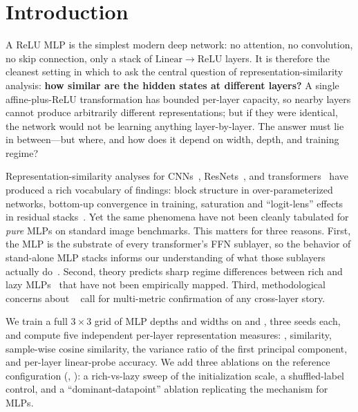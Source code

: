 \section{Introduction}
\label{sec:intro}

A ReLU MLP is the simplest modern deep network: no attention, no convolution, no skip connection, only a stack of $\mathrm{Linear}\!\to\!\mathrm{ReLU}$ layers. It is therefore the cleanest setting in which to ask the central question of representation-similarity analysis: \textbf{how similar are the hidden states at different layers?} A single affine-plus-ReLU transformation has bounded per-layer capacity, so nearby layers cannot produce arbitrarily different representations; but if they were identical, the network would not be learning anything layer-by-layer. The answer must lie in between---but where, and how does it depend on width, depth, and training regime?

Representation-similarity analyses for CNNs~\citep{kornblith2019similarity,nguyen2021wide}, ResNets~\citep{nguyen2022origins}, and transformers~\citep{raghu2021vit,brown2023dissimilarity} have produced a rich vocabulary of findings: block structure in over-parameterized networks, bottom-up convergence in training, saturation and ``logit-lens'' effects in residual stacks~\citep{jiang2024tracing}. Yet the same phenomena have not been cleanly tabulated for \emph{pure} MLPs on standard image benchmarks. This matters for three reasons. First, the MLP is the substrate of every transformer's FFN sublayer, so the behavior of stand-alone MLP stacks informs our understanding of what those sublayers actually do~\citep{pessoa2023onewide}. Second, theory predicts sharp regime differences between rich and lazy MLPs~\citep{tong2025richness,chizat2019global} that have not been empirically mapped. Third, methodological concerns about \ckam~\citep{davari2022reliability} call for multi-metric confirmation of any cross-layer story.

 We train a full $3\!\times\!3$ grid of MLP depths and widths on \cifar and \mnist, three seeds each, and compute five independent per-layer representation measures: \ckam, \procrustes similarity, sample-wise cosine similarity, the variance ratio of the first principal component, and per-layer linear-probe accuracy. We add three ablations on the reference configuration (, \cifar): a rich-vs-lazy sweep of the initialization scale, a shuffled-label control, and a ``dominant-datapoint'' ablation replicating the \citet{nguyen2022origins} mechanism for MLPs.

